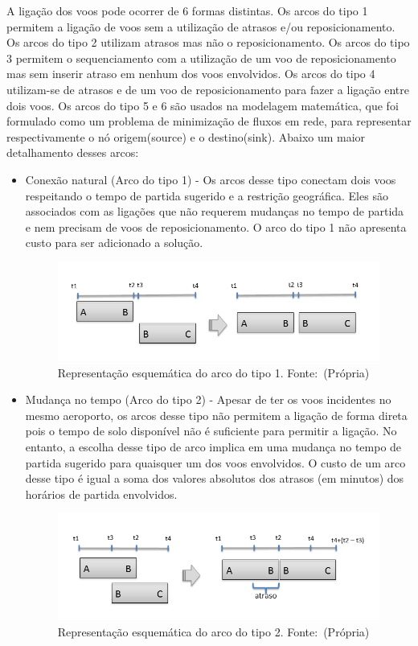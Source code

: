 A ligação dos voos pode ocorrer de 6 formas distintas. Os arcos do tipo 1
permitem a ligação de voos sem a utilização de atrasos e/ou reposicionamento.
Os arcos do tipo 2 utilizam atrasos mas não o reposicionamento. Os arcos do
tipo 3 permitem o sequenciamento com a utilização de um voo de reposicionamento
mas sem inserir atraso em nenhum dos voos envolvidos. Os arcos do tipo 4
utilizam-se de atrasos e de um voo de reposicionamento para fazer a ligação
entre dois voos. Os arcos do tipo 5 e 6 são usados na modelagem matemática, que
foi formulado como um problema de minimização de fluxos em rede, para
representar respectivamente o nó origem(source) e o destino(sink). Abaixo um
maior detalhamento desses arcos:
  
\begin{itemize}
\item Conexão natural (Arco do tipo 1) - Os arcos desse tipo conectam dois voos
respeitando o tempo de partida sugerido e a restrição geográfica. Eles são
associados com as ligações que não requerem mudanças no tempo de partida e nem
precisam de voos de reposicionamento. O arco do tipo 1 não apresenta custo para
ser adicionado a solução.

\begin{figure}[ht]
	\caption{Representação esquemática do arco do tipo 1. \mbox{Fonte: (Própria)}}
	\label{fig:arc1}
	\includegraphics[scale=0.35]{./img/arc1}
	
\end{figure}

\item Mudança no tempo (Arco do tipo 2) - Apesar de ter os voos incidentes no
mesmo aeroporto, os arcos desse tipo não permitem a ligação de forma direta
pois o tempo de solo disponível não é suficiente para permitir a ligação. No
entanto, a escolha desse tipo de arco implica em uma mudança no tempo de
partida sugerido para quaisquer um dos voos envolvidos. O custo de um arco
desse tipo é igual a soma dos valores absolutos dos atrasos (em minutos) dos
horários de partida envolvidos.
      
\begin{figure}[ht]
	\caption{Representação esquemática do arco do tipo 2. \mbox{Fonte: (Própria)}}
	\label{fig:arc2}
	\includegraphics[scale=0.35]{./img/arc2}
	

\end{figure}
\end{itemize}
